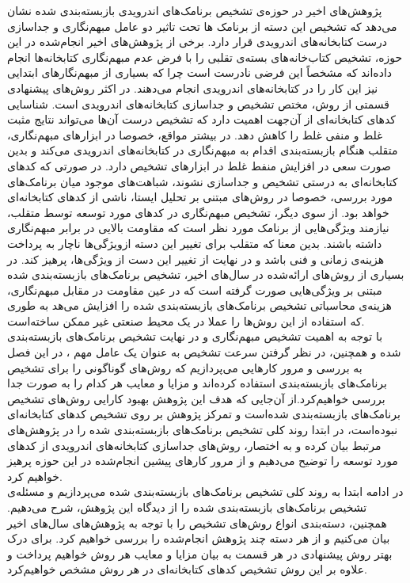 پژوهش‌های اخیر در حوزه‌ی تشخیص برنامک‌های اندرویدی بازبسته‌بندی شده نشان می‌دهد که تشخیص این دسته از برنامک ها تحت تاثیر دو عامل مبهم‌نگاری و جداسازی درست کتابخانه‌های اندرویدی قرار دارد. برخی از پژوهش‌های اخیر انجام‌شده در این حوزه، تشخیص کتاب‌خانه‌های بسته‌ی تقلبی را با فرض عدم مبهم‌نگاری کتابخانه‌ها انجام داده‌اند که مشخصاً این فرضی نادرست است چرا که بسیاری از مبهم‌نگار‌های ابتدایی نیز این کار را در کتابخانه‌های اندرویدی انجام می‌دهند. در اکثر روش‌های پیشنهادی قسمتی از روش، مختص تشخیص و جداسازی کتابخانه‌های اندرویدی‌ است. شناسایی کد‌های کتابخانه‌ای از آن‌جهت اهمیت دارد که تشخیص درست آن‌ها می‌تواند نتایج مثبت غلط و منفی غلط را کاهش دهد. در بیشتر مواقع، خصوصا در ابزار‌های مبهم‌نگاری، متقلب هنگام بازبسته‌بندی اقدام به مبهم‌نگاری در کتابخانه‌های اندرویدی می‌کند و بدین صورت سعی در افزایش منفط غلط در ابزار‌های تشخیص دارد. در صورتی که کد‌های کتابخانه‌ای به درستی تشخیص و جداسازی نشوند، شباهت‌های موجود میان برنامک‌های مورد بررسی، خصوصا در روش‌های مبتنی بر تحلیل ایستا،‌ ناشی از کد‌های کتابخانه‌ای خواهد بود. از سوی دیگر، تشخیص مبهم‌نگاری در کد‌های مورد توسعه توسط متقلب، نیازمند ویژگی‌هایی از برنامک مورد نظر است که مقاومت بالایی در برابر مبهم‌نگاری داشته‌ باشند. بدین معنا که متقلب برای تغییر این دسته ازویژگی‌ها ناچار به پرداخت هزینه‌ی زمانی و فنی باشد و در نهایت از تغییر این دست از ویژگی‌ها، پرهیز کند. در بسیاری از روش‌های ارائه‌شده در سال‌های اخیر، تشخیص برنامک‌های بازبسته‌بندی شده مبتنی بر ویژگی‌هایی صورت گرفته‌ است که در عین مقاومت در مقابل مبهم‌نگاری، هزینه‌ی محاسباتی تشخیص برنامک‌های بازبسته‌بندی شده را افزایش می‌هد به طوری که استفاده از این روش‌ها را عملا در یک محیط صنعتی غیر ممکن ساخته‌است. \\
با توجه به اهمیت تشخیص مبهم‌نگاری و در نهایت تشخیص برنامک‌های بازبسته‌بندی شده و همچنین، در نظر گرفتن سرعت تشخیص به عنوان یک عامل مهم ، در این فصل به بررسی و مرور کار‌هایی می‌پردازیم که روش‌های گوناگونی را برای تشخیص برنامک‌های بازبسته‌بندی استفاده کرده‌اند و مزایا و معایب هر کدام را به صورت جدا بررسی خواهیم‌کرد.از آن‌جایی که هدف این پژوهش بهبود کارایی روش‌های تشخیص برنامک‌های بازبسته‌بندی شده‌است و تمرکز پژوهش بر روی تشخیص کد‌های کتابخانه‌ای نبوده‌است، در ابتدا روند کلی تشخیص برنامک‌های بازبسته‌بندی‌ شده را در پژوهش‌های مرتبط بیان کرده و به اختصار، روش‌های جداسازی کتابخانه‌های اندرویدی از کد‌های مورد توسعه را توضیح می‌دهیم و از مرور کار‌های پیشین انجام‌شده در این حوزه پرهیز خواهیم کرد.
\\
در ادامه ابتدا به روند کلی تشخیص برنامک‌های بازبسته‌بندی شده می‌پردازیم و مسئله‌ی تشخیص برنامک‌های بازبسته‌بندی شده را از دیدگاه این پژوهش، شرح می‌دهیم. همچنین، دسته‌بندی انواع روش‌های تشخیص را با توجه به پژوهش‌های سال‌های اخیر بیان‌ می‌کنیم و از هر دسته چند پژوهش انجام‌شده را بررسی خواهیم کرد. برای درک بهتر روش‌ پیشنهادی در هر قسمت به بیان مزایا و معایب هر روش خواهیم پرداخت و علاوه بر این روش تشخیص کد‌های ‌کتابخانه‌ای  در هر روش مشخص خواهیم‌کرد.


